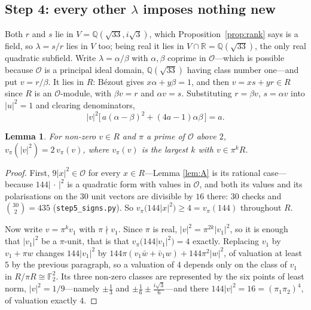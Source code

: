 \documentclass[11pt,reqno]{amsart}
\theoremstyle{plain}
\newtheorem{lemma}[theorem]{Lemma}
\theoremstyle{definition}
\newcommand{\Q}{\mathbb{Q}}
\newcommand{\R}{\mathbb{R}}
\newcommand{\F}{\mathbb{F}}
\newcommand{\Lat}{R}
\newcommand{\Ok}{\mathcal{O}}
\begin{document}
\subsection*{Step 4: every other $\lambda$ imposes nothing new}
Both $r$ and $s$ lie in $V = \Q(\sqrt{33}, i\sqrt3)$, which
Proposition~\ref{prop:rank} says is a field, so $\lambda = s/r$ lies in $V$ too;
being real it lies in $V \cap \R = \Q(\sqrt{33})$, the only real quadratic
subfield. Write $\lambda = \alpha/\beta$ with $\alpha,\beta$ coprime in $\Ok$---which
is possible because $\Ok$ is a principal ideal domain, $\Q(\sqrt{33})$ having class
number one---and put $v = r/\beta$. It lies in $\Lat$: B\'ezout gives
$x\alpha + y\beta = 1$, and then $v = xs + yr \in \Lat$ since $\Lat$ is an
$\Ok$-module, with $\beta v = r$ and $\alpha v = s$. Substituting $r = \beta v$, $s = \alpha v$
into $\lvert u \rvert^2 = 1$ and clearing denominators,
\begin{equation}\label{eq:star}
  \lvert v \rvert^2 \big[\, a(\alpha-\beta)^2 + (4a-1)\alpha\beta \,\big] = a .
\end{equation}

\begin{lemma}\label{lem:val}
For non-zero $v \in \Lat$ and $\pi$ a prime of $\Ok$ above $2$,
$v_\pi(\lvert v \rvert^2) = 2\,v_\pi(v)$, where $v_\pi(v)$ is the largest $k$ with
$v \in \pi^k\Lat$.
\end{lemma}

\begin{proof}
First, $9\lvert x \rvert^2 \in \Ok$ for every $x \in \Lat$---Lemma \ref{lem:A} is
its rational case---because $144\lvert\,\cdot\,\rvert^2$ is a quadratic form with
values in $\Ok$, and both its values and its polarisations on the $30$ unit
vectors are divisible by $16$ there: $30$ checks and $\binom{30}{2} = 435$
(\texttt{step5\_signs.py}). So
$v_\pi\big(144\lvert x\rvert^2\big) \ge 4 = v_\pi(144)$ throughout $\Lat$.

Now write $v = \pi^k v_1$ with $\pi \nmid v_1$. Since $\pi$ is real,
$\lvert v \rvert^2 = \pi^{2k}\lvert v_1 \rvert^2$, so it is enough that
$\lvert v_1 \rvert^2$ be a $\pi$-unit, that is that
$v_\pi\big(144\lvert v_1\rvert^2\big) = 4$ exactly. Replacing $v_1$ by
$v_1 + \pi w$ changes $144\lvert v_1 \rvert^2$ by
$144\pi(v_1\bar w + \bar v_1 w) + 144\pi^2\lvert w \rvert^2$, of valuation at least
$5$ by the previous paragraph, so a valuation of $4$ depends only on the class of
$v_1$ in $\Lat/\pi\Lat \cong \F_2^2$. Its three non-zero classes are represented by the six
points of least norm, $\lvert v \rvert^2 = 1/9$---namely $\pm\tfrac13$ and
$\pm\tfrac16 \pm \tfrac{i\sqrt3}{6}$---and there
$144\lvert v\rvert^2 = 16 = (\pi_1\pi_2)^4$, of valuation exactly $4$.
\end{proof}
\end{document}
